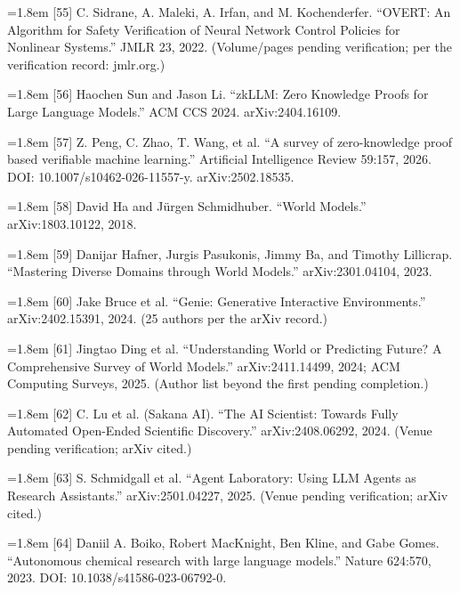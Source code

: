 \documentclass[11pt]{article}
\begin{document}
\noindent\hangindent=1.8em [55] C. Sidrane, A. Maleki, A. Irfan, and M. Kochenderfer. ``OVERT: An Algorithm for Safety Verification of Neural Network Control Policies for Nonlinear Systems.'' JMLR 23, 2022. (Volume/pages pending verification; per the verification record: jmlr.org.)\par\medskip
\noindent\hangindent=1.8em [56] Haochen Sun and Jason Li. ``zkLLM: Zero Knowledge Proofs for Large Language Models.'' ACM CCS 2024. arXiv:2404.16109.\par\medskip
\noindent\hangindent=1.8em [57] Z. Peng, C. Zhao, T. Wang, et al. ``A survey of zero-knowledge proof based verifiable machine learning.'' Artificial Intelligence Review 59:157, 2026. DOI: 10.1007/s10462-026-11557-y. arXiv:2502.18535.\par\medskip
\noindent\hangindent=1.8em [58] David Ha and Jürgen Schmidhuber. ``World Models.'' arXiv:1803.10122, 2018.\par\medskip
\noindent\hangindent=1.8em [59] Danijar Hafner, Jurgis Pasukonis, Jimmy Ba, and Timothy Lillicrap. ``Mastering Diverse Domains through World Models.'' arXiv:2301.04104, 2023.\par\medskip
\noindent\hangindent=1.8em [60] Jake Bruce et al. ``Genie: Generative Interactive Environments.'' arXiv:2402.15391, 2024. (25 authors per the arXiv record.)\par\medskip
\noindent\hangindent=1.8em [61] Jingtao Ding et al. ``Understanding World or Predicting Future? A Comprehensive Survey of World Models.'' arXiv:2411.14499, 2024; ACM Computing Surveys, 2025. (Author list beyond the first pending completion.)\par\medskip
\noindent\hangindent=1.8em [62] C. Lu et al. (Sakana AI). ``The AI Scientist: Towards Fully Automated Open-Ended Scientific Discovery.'' arXiv:2408.06292, 2024. (Venue pending verification; arXiv cited.)\par\medskip
\noindent\hangindent=1.8em [63] S. Schmidgall et al. ``Agent Laboratory: Using LLM Agents as Research Assistants.'' arXiv:2501.04227, 2025. (Venue pending verification; arXiv cited.)\par\medskip
\noindent\hangindent=1.8em [64] Daniil A. Boiko, Robert MacKnight, Ben Kline, and Gabe Gomes. ``Autonomous chemical research with large language models.'' Nature 624:570, 2023. DOI: 10.1038/s41586-023-06792-0.\par\medskip
\appendix
\end{document}
